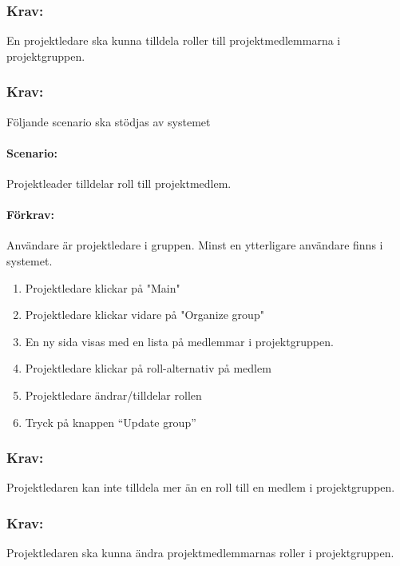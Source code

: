 \documentclass[paper=a4, fontsize=11pt,twoside]{article}
\begin{document}
\subsubsection{Krav:} En projektledare ska kunna tilldela roller till projektmedlemmarna i projektgruppen.

\paragraph{}
\subsubsection{Krav:}
Följande scenario ska stödjas av systemet
\paragraph{Scenario:}
Projektleader tilldelar roll till projektmedlem.
\paragraph{Förkrav:}
Användare är projektledare i gruppen. Minst en ytterligare användare finns i systemet.
\begin{enumerate} 
\item Projektledare klickar på "Main"
\item Projektledare klickar vidare på "Organize group"
\item En ny sida visas med en lista på medlemmar i projektgruppen.
\item Projektledare klickar på roll-alternativ på medlem
\item Projektledare ändrar/tilldelar rollen
\item Tryck på knappen “Update group”
\end{enumerate}

\paragraph{}
\subsubsection{Krav:}
	Projektledaren kan inte tilldela mer än en roll till en medlem i projektgruppen.

\paragraph{}
\subsubsection{Krav:}
	Projektledaren ska kunna ändra projektmedlemmarnas roller i projektgruppen.
\end{document}
